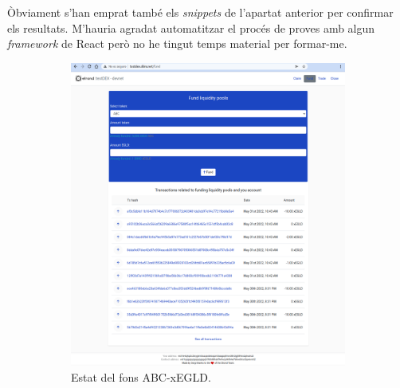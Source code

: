 \documentclass[11pt,a4paper]{article}
\begin{document}
Òbviament s'han emprat també els \textit{snippets} de l'apartat anterior per confirmar els resultats. M'hauria agradat automatitzar el procés de proves amb algun \textit{framework} de React però no he tingut temps material per formar-me.

\clearpage

\begin{figure}[!htb]
	\begin{subfigure}[b]{0.42\textwidth}
	  \includegraphics[width=\linewidth]{imp-liqpools1.png}
	  \caption{Estat del fons ABC-xEGLD.}\label{fig:imp-liqpools1}
	\end{subfigure}\hfill
	\begin{subfigure}[b]{0.42\textwidth}

\end{subfigure}
\end{figure}
\end{document}
